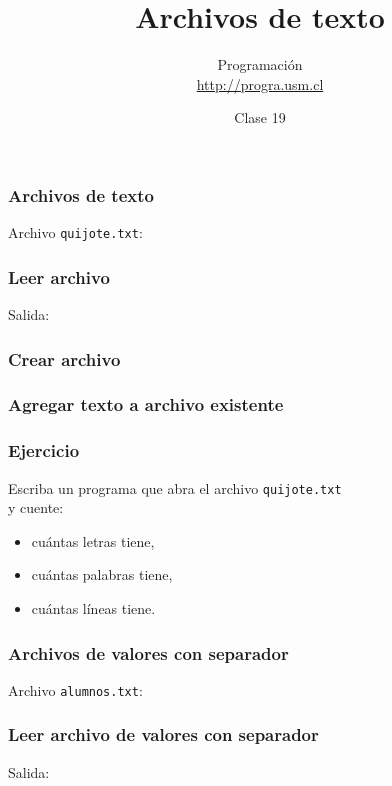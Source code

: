 \documentclass[12pt]{beamer}
\title{Archivos de texto}
\author{
  Programación \\ \url{http://progra.usm.cl}
}
\date{Clase 19}
\begin{document}
  \begin{frame}
    \maketitle
  \end{frame}

  \begin{frame}
    \label{archivo-texto}
    \frametitle{Archivos de texto}
    Archivo \texttt{quijote.txt}:
    
  \end{frame}

  \begin{frame}
    \label{leer-archivo-texto}
    \frametitle{Leer archivo}
    
    \vfill
    Salida:
    
  \end{frame}

  \begin{frame}
    \label{crear-archivo-texto}
    \frametitle{Crear archivo}
    
  \end{frame}

  \begin{frame}
    \label{agregar-a-archivo-texto}
    \frametitle{Agregar texto a archivo existente}
    
  \end{frame}

  \begin{frame}
    \label{ejercicio-archivos-texto}
    \frametitle{Ejercicio}
    Escriba un programa que abra el archivo \texttt{quijote.txt} \\ y cuente:
    \begin{itemize}
      \item cuántas letras tiene,
      \item cuántas palabras tiene,
      \item cuántas líneas tiene.
    \end{itemize}
  \end{frame}

  \begin{frame}
    \label{archivo-csv}
    \frametitle{Archivos de valores con separador}
    Archivo \texttt{alumnos.txt}:
    
  \end{frame}

  \begin{frame}
    \label{leer-archivo-csv}
    \frametitle{Leer archivo de valores con separador}
    
    \vfill
    Salida:
    
  \end{frame}
\end{document}
